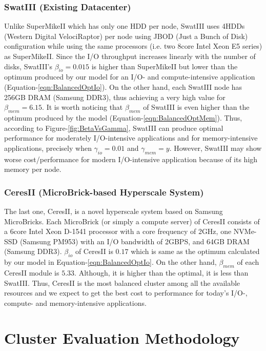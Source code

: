 \documentclass[journal]{IEEEtran}
\begin{document}
\subsubsection{SwatIII (Existing Datacenter)}
Unlike SuperMikeII which has only one HDD per node, SwatIII uses 4HDDs (Western Digital VelociRaptor) per node using JBOD (Just a Bunch of Disk) configuration while using the same processors (i.e. two 8core Intel Xeon E5 series) as SuperMikeII. Since the I/O throughput increases linearly with the number of disks, SwatIII's $\beta_{io}=0.015$ is higher than SuperMikeII but lower than the optimum produced by our model for an I/O- and compute-intensive application (Equation-\ref{eqn:BalancedOptIo}). On the other hand, each SwatIII node has 256GB DRAM (Samsung DDR3), thus achieving a very high value for $\beta_{mem}=6.15$. It is worth noticing that $\beta_{mem}$ of SwatIII is even higher than the optimum produced by the model (Equation-\ref{eqn:BalancedOptMem}). Thus, according to Figure-\ref{fig:BetaVsGamma}, SwatIII can produce optimal performance for moderately I/O-intensive applications and for memory-intensive applications, precisely when $\gamma_{io} = 0.01$ and $\gamma_{mem}=y$. However, SwatIII may show worse cost/performance for modern I/O-intensive application because of its high memory per node. 
\subsubsection{CeresII (MicroBrick-based Hyperscale System)}
The last one, CeresII, is a novel hyperscale system based on Samsung MicroBricks. Each MicroBrick (or simply a compute server) of CeresII consists of a 6core Intel Xeon D-1541 processor with a core frequency of 2GHz, one NVMe-SSD (Samsung PM953) with an I/O bandwidth of 2GBPS, and 64GB DRAM (Samsung DDR3). $\beta_{io}$ of CeresII is $0.17$ which is same as the optimum calculated by our model in Equation-\ref{eqn:BalancedOptIo}.  On the other hand, $\beta_{mem}$ of each CeresII module is $5.33$. Although, it is higher than the optimal, it is less than SwatIII. Thus, CeresII is the most balanced cluster among all the available resources and we expect to get the best cost to performance for today's I/O-, compute- and memory-intensive applications. 

\section{Cluster Evaluation Methodology} \label{sec:EvalMethod}
\end{document}
